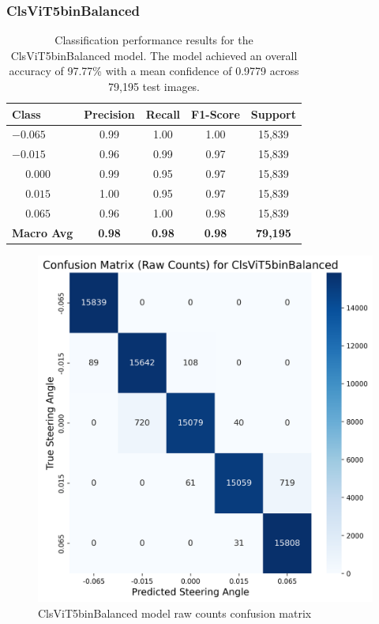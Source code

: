 \subsubsection{ClsViT5binBalanced}

\begin{table}[htbp]
\centering
\begin{tabular}{@{}lcccc@{}}
\toprule
\textbf{Class} & \textbf{Precision} & \textbf{Recall} & \textbf{F1-Score} & \textbf{Support} \\
\midrule
$-0.065$ & 0.99 & 1.00 & 1.00 & 15,839 \\
$-0.015$ & 0.96 & 0.99 & 0.97 & 15,839 \\
$\phantom{-}0.000$ & 0.99 & 0.95 & 0.97 & 15,839 \\
$\phantom{-}0.015$ & 1.00 & 0.95 & 0.97 & 15,839 \\
$\phantom{-}0.065$ & 0.96 & 1.00 & 0.98 & 15,839 \\
\midrule
\textbf{Macro Avg} & \textbf{0.98} & \textbf{0.98} & \textbf{0.98} & \textbf{79,195} \\
\bottomrule
\end{tabular}
\caption{Classification performance results for the ClsViT5binBalanced model. The model achieved an overall accuracy of 97.77\% with a mean confidence of 0.9779 across 79,195 test images.}
\label{tab:clf_report_ClsViT5binBalanced}
\end{table}

\begin{figure}[H]
\centering
\includegraphics[width=0.65\linewidth]{Figures/Results/cm_raw_ClsViT5binBalanced.png}
\caption{ClsViT5binBalanced model raw counts confusion matrix}
\label{fig:cm_raw_ClsViT5binBalanced}
\end{figure}

